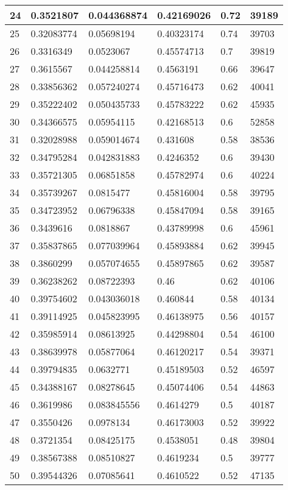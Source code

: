 \begin{longtable}{|l|l|l|l|l|l|}
24 & 0.3521807 & 0.044368874 & 0.42169026 & 0.72 & 39189 \\ \hline 
25 & 0.32083774 & 0.05698194 & 0.40323174 & 0.74 & 39703 \\ \hline 
26 & 0.3316349 & 0.0523067 & 0.45574713 & 0.7 & 39819 \\ \hline 
27 & 0.3615567 & 0.044258814 & 0.4563191 & 0.66 & 39647 \\ \hline 
28 & 0.33856362 & 0.057240274 & 0.45716473 & 0.62 & 40041 \\ \hline 
29 & 0.35222402 & 0.050435733 & 0.45783222 & 0.62 & 45935 \\ \hline 
30 & 0.34366575 & 0.05954115 & 0.42168513 & 0.6 & 52858 \\ \hline 
31 & 0.32028988 & 0.059014674 & 0.431608 & 0.58 & 38536 \\ \hline 
32 & 0.34795284 & 0.042831883 & 0.4246352 & 0.6 & 39430 \\ \hline 
33 & 0.35721305 & 0.06851858 & 0.45782974 & 0.6 & 40224 \\ \hline 
34 & 0.35739267 & 0.0815477 & 0.45816004 & 0.58 & 39795 \\ \hline 
35 & 0.34723952 & 0.06796338 & 0.45847094 & 0.58 & 39165 \\ \hline 
36 & 0.3439616 & 0.0818867 & 0.43789998 & 0.6 & 45961 \\ \hline 
37 & 0.35837865 & 0.077039964 & 0.45893884 & 0.62 & 39945 \\ \hline 
38 & 0.3860299 & 0.057074655 & 0.45897865 & 0.62 & 39587 \\ \hline 
39 & 0.36238262 & 0.08722393 & 0.46 & 0.62 & 40106 \\ \hline 
40 & 0.39754602 & 0.043036018 & 0.460844 & 0.58 & 40134 \\ \hline 
41 & 0.39114925 & 0.045823995 & 0.46138975 & 0.56 & 40157 \\ \hline 
42 & 0.35985914 & 0.08613925 & 0.44298804 & 0.54 & 46100 \\ \hline 
43 & 0.38639978 & 0.05877064 & 0.46120217 & 0.54 & 39371 \\ \hline 
44 & 0.39794835 & 0.0632771 & 0.45189503 & 0.52 & 46597 \\ \hline 
45 & 0.34388167 & 0.08278645 & 0.45074406 & 0.54 & 44863 \\ \hline 
46 & 0.3619986 & 0.083845556 & 0.4614279 & 0.5 & 40187 \\ \hline 
47 & 0.3550426 & 0.0978134 & 0.46173003 & 0.52 & 39922 \\ \hline 
48 & 0.3721354 & 0.08425175 & 0.4538051 & 0.48 & 39804 \\ \hline 
49 & 0.38567388 & 0.08510827 & 0.4619234 & 0.5 & 39777 \\ \hline 
50 & 0.39544326 & 0.07085641 & 0.4610522 & 0.52 & 47135 \\ \hline 
\end{longtable}
